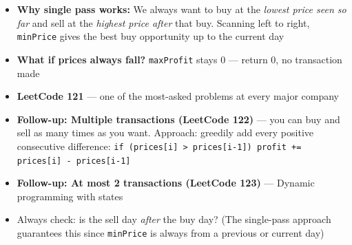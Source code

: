 \documentclass[12pt,a4paper,oneside]{book}
\begin{document}
\begin{interviewcorner}
\begin{itemize}
  \item \textbf{Why single pass works:} We always want to buy at the \textit{lowest price seen so far} and sell at the \textit{highest price after} that buy. Scanning left to right, \texttt{minPrice} gives the best buy opportunity up to the current day
  \item \textbf{What if prices always fall?} \texttt{maxProfit} stays 0 --- return 0, no transaction made
  \item \textbf{LeetCode 121} --- one of the most-asked problems at every major company
  \item \textbf{Follow-up: Multiple transactions (LeetCode 122)} --- you can buy and sell as many times as you want. Approach: greedily add every positive consecutive difference: \texttt{if (prices[i] > prices[i-1]) profit += prices[i] - prices[i-1]}
  \item \textbf{Follow-up: At most 2 transactions (LeetCode 123)} --- Dynamic programming with states
  \item Always check: is the sell day \textit{after} the buy day? (The single-pass approach guarantees this since \texttt{minPrice} is always from a previous or current day)
\end{itemize}
\end{interviewcorner}
\end{document}
